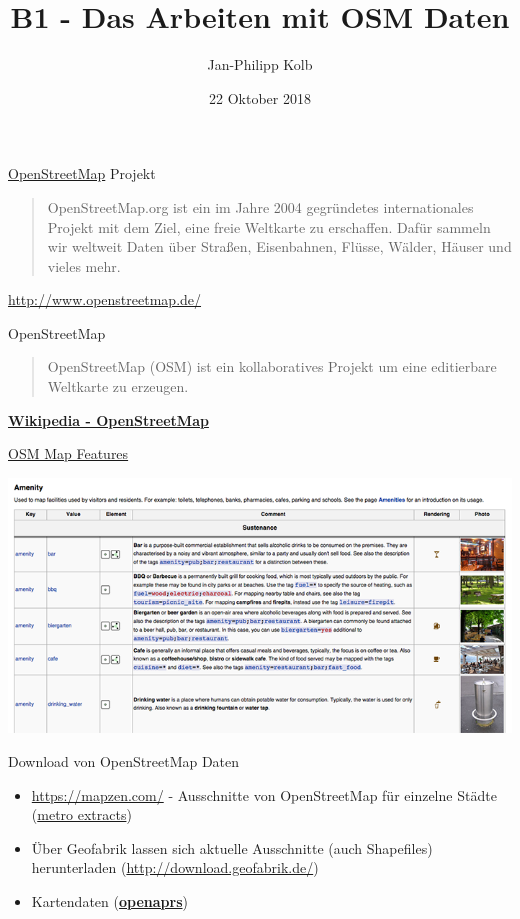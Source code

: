 \documentclass[ignorenonframetext,]{beamer}
\title{B1 - Das Arbeiten mit OSM Daten}
\author{Jan-Philipp Kolb}
\date{22 Oktober 2018}
\begin{document}
\frame{\titlepage}

\begin{frame}{\href{http://www.openstreetmap.de/}{OpenStreetMap}
Projekt}

\begin{quote}
OpenStreetMap.org ist ein im Jahre 2004 gegründetes internationales
Projekt mit dem Ziel, eine freie Weltkarte zu erschaffen. Dafür sammeln
wir weltweit Daten über Straßen, Eisenbahnen, Flüsse, Wälder, Häuser und
vieles mehr.
\end{quote}

\url{http://www.openstreetmap.de/}

\end{frame}

\begin{frame}{OpenStreetMap}

\begin{quote}
OpenStreetMap (OSM) ist ein kollaboratives Projekt um eine editierbare
Weltkarte zu erzeugen.
\end{quote}

\href{https://en.wikipedia.org/wiki/OpenStreetMap}{\textbf{Wikipedia -
OpenStreetMap}}

\end{frame}

\begin{frame}{\href{http://wiki.openstreetmap.org/wiki/DE:Map_Features}{OSM
Map Features}}

\includegraphics{figure/osm_mapfeatures.png}

\end{frame}

\begin{frame}{Download von OpenStreetMap Daten}

\begin{itemize}
\item
  \url{https://mapzen.com/} - Ausschnitte von OpenStreetMap für einzelne
  Städte (\href{https://mapzen.com/data/metro-extracts/}{metro
  extracts})
\item
  Über Geofabrik lassen sich aktuelle Ausschnitte (auch Shapefiles)
  herunterladen (\url{http://download.geofabrik.de/})
\item
  Kartendaten (\href{http://www.openaprs.net/}{\textbf{openaprs}})
\end{itemize}

\end{frame}
\end{document}
